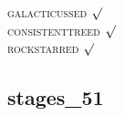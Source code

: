 


\textsc{galacticussed} $\surd$ \\
\textsc{consistenttreed} $\surd$ \\ 
\textsc{rockstarred} $\surd$


% 
%
%
%
%
%
%
%


\newpage
\subsection{stages\_51}

